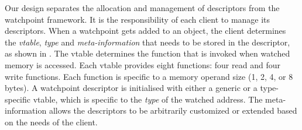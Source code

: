 \documentclass[letterpaper,twocolumn,10pt]{article}
\begin{document}
Our design separates the allocation and management of descriptors from the watchpoint framework. It is the responsibility of each client to manage its descriptors. When a watchpoint gets added to an object, the client determines the \emph{vtable}, \emph{type} and \emph{meta-information} that needs to be stored in the descriptor, as shown in . The vtable determines the function that is invoked when watched memory is accessed. Each vtable provides eight functions: four read and four write functions. Each function is specific to a memory operand size (1, 2, 4, or 8 bytes). A watchpoint descriptor is initialised with either a generic or a type-specific vtable, which is specific to the \emph{type} of the watched address. The meta-information allows the descriptors to be arbitrarily customized or extended based on the needs of the client.












\end{document}
